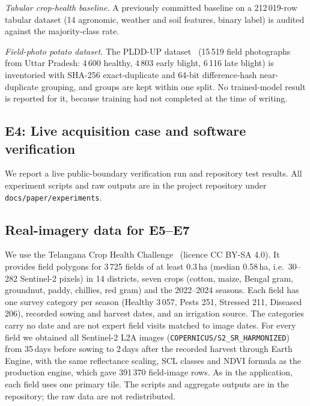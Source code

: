 \documentclass[conference]{IEEEtran}
\begin{document}
\textit{Tabular crop-health baseline.} A previously committed baseline on a 212\,019-row tabular dataset (14 agronomic, weather and soil features, binary label) is audited against the majority-class rate.

\textit{Field-photo potato dataset.} The PLDD-UP dataset~\cite{plddup2026} (15\,519 field photographs from Uttar Pradesh: 4\,600 healthy, 4\,803 early blight, 6\,116 late blight) is inventoried with SHA-256 exact-duplicate and 64-bit difference-hash near-duplicate grouping, and groups are kept within one split. No trained-model result is reported for it, because training had not completed at the time of writing.

\subsection{E4: Live acquisition case and software verification}
We report a live public-boundary verification run and repository test results. All experiment scripts and raw outputs are in the project repository under \texttt{docs/paper/experiments}.

\subsection{Real-imagery data for E5--E7}\label{sec:realdata}
We use the Telangana Crop Health Challenge~\cite{telangana2024} (licence CC BY-SA 4.0). It provides field polygons for 3\,725 fields of at least 0.3\,ha (median 0.58\,ha, i.e.\ 30--282 Sentinel-2 pixels) in 14 districts, seven crops (cotton, maize, Bengal gram, groundnut, paddy, chillies, red gram) and the 2022--2024 seasons. Each field has one survey category per season (Healthy 3\,057, Pests 251, Stressed 211, Diseased 206), recorded sowing and harvest dates, and an irrigation source. The categories carry no date and are not expert field visits matched to image dates. For every field we obtained all Sentinel-2 L2A images (\texttt{COPERNICUS/S2\_SR\_HARMONIZED}) from 35\,days before sowing to 2\,days after the recorded harvest through Earth Engine, with the same reflectance scaling, SCL classes and NDVI formula as the production engine, which gave 391\,370 field-image rows. As in the application, each field uses one primary tile. The scripts and aggregate outputs are in the repository; the raw data are not redistributed.
\end{document}
